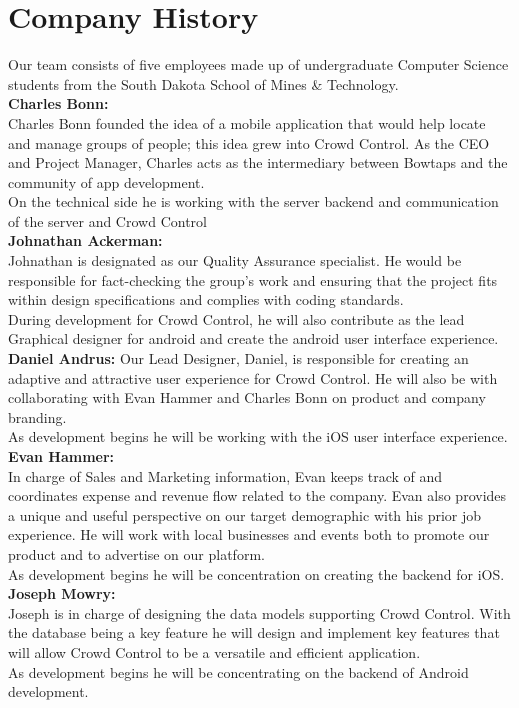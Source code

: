 \section{Company History}

Our team consists of five employees made up of undergraduate Computer Science students from the South Dakota School of Mines \& Technology. \\

\noindent
\textbf{Charles Bonn:}\\ Charles Bonn founded the idea of a mobile application that would help locate and manage groups of people; this idea grew into Crowd Control. As the CEO and Project Manager, Charles acts as the intermediary between Bowtaps and the community of app development. \\
On the technical side he is working with the server backend and communication of the server and Crowd Control \\

\noindent
\textbf{Johnathan Ackerman:}\\ Johnathan is designated as our Quality Assurance specialist. He would be responsible for fact-checking the group’s work and ensuring that the project fits within design specifications and complies with coding standards.\\
 During development for Crowd Control, he will also contribute as the lead Graphical designer for android and create the android user interface experience.\\
 
\noindent
\textbf{Daniel Andrus:} Our Lead Designer, Daniel, is responsible for creating an adaptive and attractive user experience for Crowd Control. He will also be with collaborating with Evan Hammer and Charles Bonn on product and company branding.\\
 As development begins he will be working with the iOS user interface experience.\\
 
\noindent
\textbf{Evan Hammer:}\\ In charge of Sales and Marketing information, Evan keeps track of and coordinates expense and revenue flow related to the company. Evan also provides a unique and useful perspective on our target demographic with his prior job experience. He will work with local businesses and events both to promote our product and to advertise on our platform.\\
 As development begins he will be concentration on creating the backend for iOS. \\
 
\noindent
\textbf{Joseph Mowry:}\\ Joseph is in charge of designing the data models supporting Crowd Control. With the database being a key feature he will design and implement key features that will allow Crowd Control to be a versatile and efficient application.\\
 As development begins he will be concentrating on the backend of Android development.\\






